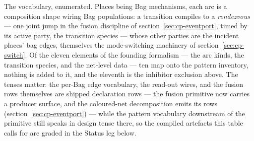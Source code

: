 The vocabulary, enumerated. Places being Bag mechanisms, each arc is
a composition shape wiring Bag populations: a transition compiles to
a \emph{rendezvous} --- one joint jump in the fusion discipline of
section~\ref{sec:cp-eventport}, timed by its active party, the
transition species --- whose other parties are the incident places'
bag edges, themselves the mode-switching machinery of
section~\ref{sec:cp-switch}. Of the eleven elements of the founding
formalism --- the arc kinds, the transition species, and the
net-level data --- ten map onto the pattern inventory, nothing is
added to it, and the eleventh is the inhibitor exclusion above. The
tenses matter: the per-Bag edge vocabulary, the read-out wires, and
the fusion rows themselves are shipped declaration rows --- the
fusion primitive now carries a producer surface, and the
coloured-net decomposition emits its rows
(section~\ref{sec:cp-eventport}) --- while the pattern vocabulary
downstream of the primitive still speaks in design tense there, so
the compiled artefacts this table calls for are graded in the
Status leg below.

